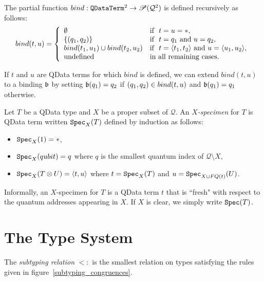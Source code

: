 \documentclass{article}
\begin{document}
\begin{definition}
The partial function $bind: \mathtt{QDataTerm}^2\to {\mathscr{P}} (\mathcal{Q}^2)$ is 
defined recursively as follows:
\[
bind (t,u)= \left\{
  \begin{array}{ll}
    \emptyset & \mbox{if}~~ t=u=*, \\
    \{(q_1,q_2)\} & \mbox{if}~~ t=q_1 \mbox{ and } u=q_2, \\        
    bind (t_1,u_1) \cup bind (t_2,u_2) & \mbox{if}~~ t=\langle t_1,t_2\rangle \mbox{ and } 
                                                     u=\langle u_1,u_2\rangle, \\
    \mbox{undefined} & \mbox{in all remaining cases.}
  \end{array}
\right.
\]
\end{definition}

\begin{remark}
\label{bind_extension}
If $t$ and $u$ are QData terms for which $bind$ is defined, we can extend $bind(t,u)$ to a 
binding $\mathfrak{b}$ by setting $\mathfrak{b} (q_1) = q_2$ if $(q_1,q_2)\in bind (t,u)$ 
and $\mathfrak{b} (q_1) = q_1$ otherwise.
\end{remark}

\begin{definition}
Let $T$ be a QData type and $X$ be a proper subset of $\mathcal{Q}$. An \emph{$X$-specimen} 
for $T$ is QData term written $\texttt{Spec}_X(T)$ defined by induction as follows:
\begin{itemize}
  \item $\texttt{Spec}_X(1)=*$,
  \item $\texttt{Spec}_X(qubit)=q$ where $q$ is the smallest quantum index of $\mathcal{Q}\setminus X$,
  \item $\texttt{Spec}_X(T\otimes U)=\langle t,u\rangle$ where $t=\texttt{Spec}_X(T)$ and $u=\texttt{Spec}_{X\cup FQ(t)}(U)$.  
\end{itemize}
\end{definition}


Informally, an $X$-specimen for $T$ is a QData term $t$ that is 
``fresh" with respect to the quantum addresses appearing in $X$.
If $X$ is clear, we simply write $\texttt{Spec} (T)$.


\section{The Type System}

\begin{definition}
The \emph{subtyping relation} $<:$ is the smallest relation on types satisfying 
the rules given in figure~\hyperref[subtyping_congruences]{\ref*{subtyping_congruences}}.
\end{definition}
\end{document}
